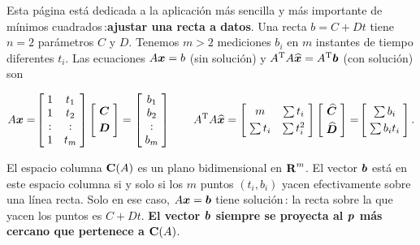 \documentclass[12pt,a4paper]{article}
\newcommand{\bi}[1]{\hbox{\boldmath$#1$}}
\newcommand\1{\mbox{\,\vrule height-0.8pt depth1.0pt width2pc\,}}
\newcommand\2{\mbox{\,\vrule height-0.8pt depth1.0pt width1pc\,}}
\DeclareRobustCommand\transp{^{\mathrm{T}}}
\begin{document}
\begin{enumerate}
Esta página está dedicada a la aplicación más sencilla y más importante de mínimos cuadrados\,:\linebreak \textbf{ajustar una recta a datos}. Una recta $b=C+Dt$ tiene $n=2$ parámetros $C$ y $D$. Tenemos $m>2$ mediciones $b_i$ en $m$ instantes de tiempo diferentes $t_i$. Las ecuaciones $A\bi{x}=b$ %
(sin solución) y $A\transp A\bi{\widehat{x}}=A\transp\bi{b}$ (con solución) son%
\vspace{-9pt}

$$
A\bi{x}=\!\left[\begin{array}{@{\;}cc@{\;}}1&t_1\\1&t_2\\:&:\\1&t_m\\\end{array}\right]\left[\begin{array}{@{\;}c@{\;}}\bi{C}\\[3pt]\bi{D}\\\end{array}\right]=\left[\begin{array}{@{\;}c@{\;}}b_1\\b_2\\:\\b_m\end{array}\right]\qquad A\transp A\bi{\widehat{x}}=\left[\begin{array}{@{\;}cc@{\;}}m&\sum t_i\\[3pt]\sum t_i&\sum t_i^2\\\end{array}\right]\left[\begin{array}{@{\;}c@{\;}}\bi{\widehat{C}}\\[3pt]\bi{\widehat{D}}\\\end{array}\right]=\!\left[\begin{array}{@{\;}c@{\;}}\sum b_i\\[3pt]\sum b_it_i\\\end{array}\right].
$$

\noindent
El espacio columna $\hbox{\textbf{C}}(A)$ es un plano bidimensional en $\hbox{\textbf{R}}^m$.
El vector $\bi{b}$ está en este espacio columna si y solo si los $m$ puntos $(t_i, b_i)$ yacen efectivamente sobre una línea recta. Solo en ese caso, $A\bi{x}=\bi{b}$ tiene solución\,: la recta sobre la que yacen los puntos es $C+Dt$. \textbf{El vector $\bi{b}$ siempre se proyecta al $\bi{p}$ más cercano que pertenece a $\hbox{\textbf{C}}(A)$}.


\end{enumerate}
\end{document}
